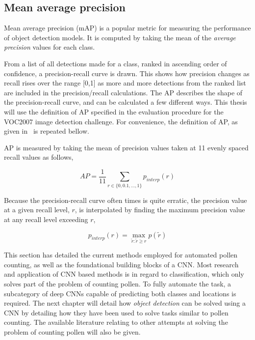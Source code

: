 \subsection{Mean average precision}
Mean average precision (mAP) is a popular metric for measuring the performance of object detection models.
It is computed by taking the mean of the \textit{average precision} values for each class.

From a list of all detections made for a class, ranked in ascending order of confidence, a precision-recall curve is drawn.
This shows how precision changes as recall rises over the range [0,1] as more and more detections from the ranked list are included in the precision/recall calculations.
The AP describes the shape of the precision-recall curve, and can be calculated a few different ways.
This thesis will use the definition of AP specified in the evaluation procedure for the VOC2007 image detection challenge.
For convenience, the definition of AP, as given in\ \textcite{everingham2010pascal} is repeated bellow.

AP is measured by taking the mean of precision values taken at 11 evenly spaced recall values as follows,

\begin{equation}\label{eq:average-precision}
  AP=\frac{1}{11} \sum_{r\in \{0,0.1,\dots,1\}}p_{interp}(r)
\end{equation}

Because the precision-recall curve often times is quite erratic, the precision value at a given recall level, \(r\), is interpolated by finding the maximum precision value at any recall level exceeding \(r\),

\begin{equation*}
  p_{interp}(r)=\max_{\tilde{r}:\tilde{r}\geq r}p(\tilde{r})
\end{equation*}

This section has detailed the current methods employed for automated pollen counting, as well as the foundational building blocks of a CNN\@.
Most research and application of CNN based methods is in regard to classification, which only solves part of the problem of counting pollen.
To fully automate the task, a subcategory of deep CNNs capable of predicting both classes and locations is required.
The next chapter will detail how \textit{object detection} can be solved using a CNN by detailing how they have been used to solve tasks similar to pollen counting.
The available literature relating to other attempts at solving the problem of counting pollen will also be given.
